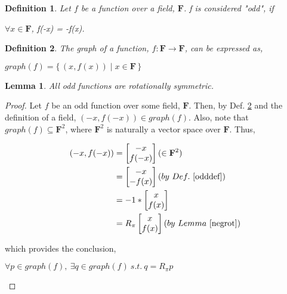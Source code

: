 \documentclass{article}
\newtheorem{definition}{Definition}
\newtheorem{lemma}{Lemma}
\begin{document}
\begin{definition}\label{odddef}
  Let $f$ be a function over a field, $\mathbf{F}$. f is considered "odd", if

  \begin{center}
    $\forall x \in \mathbf{F}$, f(-x) = -f(x).
  \end{center}
\end{definition}

\begin{definition}\label{graphdef}
  The graph of a function, $f:\mathbf{F} \rightarrow \mathbf{F}$, can be expressed as,

  \begin{center}
    $graph(f) = \{\,(x, f(x)) \mid x \in \mathbf{F}\,\}$
  \end{center}
\end{definition}

\begin{lemma}\label{oddrotlemma}
  All odd functions are rotationally symmetric.
\end{lemma}

\begin{proof}
  Let $f$ be an odd function over some field, $\mathbf{F}$. Then, by Def. \ref{graphdef} and the definition of a field,
  $(-x, f(-x)) \in graph(f)$. Also, note that $graph(f) \subseteq \mathbf{F}^2$, where
  $\mathbf{F}^2$ is naturally a vector space over $\mathbf{F}$. Thus,

  \begin{equation}
    \begin{split}
      (-x, f(-x))
      &= \begin{bmatrix}
        -x \\
        f(-x)
      \end{bmatrix} (\in \mathbf{F}^2)\\
      &= \begin{bmatrix}
        -x \\
        -f(x) \\
      \end{bmatrix} (by\ Def.\ \ref{odddef}) \\
      &= -1 * \begin{bmatrix}
        x \\
        f(x)
      \end{bmatrix} \\
      &= R_\pi \begin{bmatrix}
        x \\
        f(x)
      \end{bmatrix} (by\ Lemma\ \ref{negrot})
    \end{split}
  \end{equation}

  which provides the conclusion,

  \begin{center}
    $\forall p \in graph(f),\ \exists q \in graph(f)\ s.t.\ q = R_\pi p$
  \end{center}
\end{proof}
\end{document}
